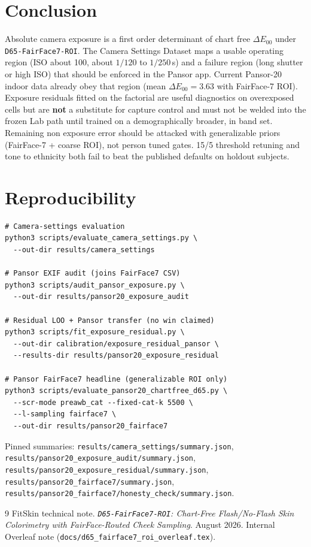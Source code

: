 \documentclass[11pt]{article}
\newcommand{\deee}{\ensuremath{\Delta E_{00}}}
\newcommand{\pipename}{\texttt{D65-FairFace7-ROI}}
\begin{document}
\section{Conclusion}

Absolute camera exposure is a first order determinant of chart free $\deee$ under \pipename{}.
The Camera Settings Dataset maps a usable operating region (ISO about 100, about $1/120$ to $1/250$\,s) and a failure region (long shutter or high ISO) that should be enforced in the Pansor app.
Current Pansor-20 indoor data already obey that region (mean $\deee=\num{3.63}$ with FairFace-7 ROI).
Exposure residuals fitted on the factorial are useful diagnostics on overexposed cells but are \textbf{not} a substitute for capture control and must not be welded into the frozen Lab path until trained on a demographically broader, in band set.
Remaining non exposure error should be attacked with generalizable priors (FairFace-7 + coarse ROI), not person tuned gates. 15/5 threshold retuning and tone to ethnicity both fail to beat the published defaults on holdout subjects.

\section*{Reproducibility}
\begin{verbatim}
# Camera-settings evaluation
python3 scripts/evaluate_camera_settings.py \
  --out-dir results/camera_settings

# Pansor EXIF audit (joins FairFace7 CSV)
python3 scripts/audit_pansor_exposure.py \
  --out-dir results/pansor20_exposure_audit

# Residual LOO + Pansor transfer (no win claimed)
python3 scripts/fit_exposure_residual.py \
  --out-dir calibration/exposure_residual_pansor \
  --results-dir results/pansor20_exposure_residual

# Pansor FairFace7 headline (generalizable ROI only)
python3 scripts/evaluate_pansor20_chartfree_d65.py \
  --scr-mode preawb_cat --fixed-cat-k 5500 \
  --l-sampling fairface7 \
  --out-dir results/pansor20_fairface7
\end{verbatim}

Pinned summaries: \texttt{results/camera\_settings/summary.json},
\texttt{results/pansor20\_exposure\_audit/summary.json},
\texttt{results/pansor20\_exposure\_residual/summary.json},
\texttt{results/pansor20\_fairface7/summary.json},
\texttt{results/pansor20\_fairface7/honesty\_check/summary.json}.

\begin{thebibliography}{9}
\bibitem{d65fairface7note}
FitSkin technical note.
\textit{\pipename{}: Chart-Free Flash/No-Flash Skin Colorimetry with FairFace-Routed Cheek Sampling}.
August 2026.
Internal Overleaf note (\texttt{docs/d65\_fairface7\_roi\_overleaf.tex}).
\end{thebibliography}
\end{document}
